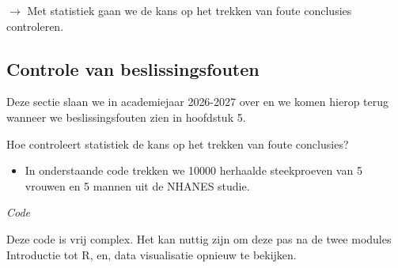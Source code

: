 \documentclass[
  12pt,dutch]{book}
\providecommand{\tightlist}{%
  \setlength{\itemsep}{0pt}\setlength{\parskip}{0pt}}
\theoremstyle{definition}
\theoremstyle{definition}
\theoremstyle{definition}
\theoremstyle{definition}
\theoremstyle{remark}
\begin{document}
\(\rightarrow\) Met statistiek gaan we de kans op het trekken van foute conclusies controleren.

\subsection{Controle van beslissingsfouten}\label{controle-van-beslissingsfouten}

Deze sectie slaan we in academiejaar 2026-2027 over en we komen hierop terug wanneer we beslissingsfouten zien in hoofdstuk 5.

Hoe controleert statistiek de kans op het trekken van foute conclusies?

\begin{itemize}
\tightlist
\item
  In onderstaande code trekken we 10000 herhaalde steekproeven van 5 vrouwen en 5 mannen uit de NHANES studie.
\end{itemize}

\emph{Code}

Deze code is vrij complex. Het kan nuttig zijn om deze pas na de twee modules Introductie tot R, en, data visualisatie opnieuw te bekijken.
\end{document}
